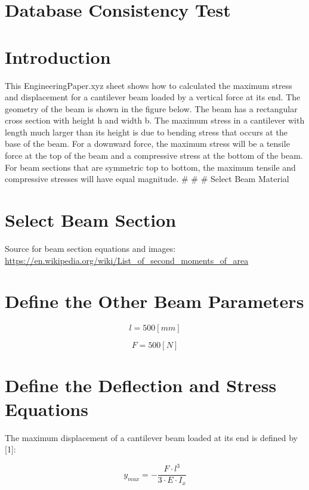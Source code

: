 \documentclass[
  letterpaper,
]{article}
\author{}
\date{}
\begin{document}
\section{Database Consistency Test}\label{database-consistency-test}

\section{Introduction}\label{introduction}

This EngineeringPaper.xyz sheet shows how to calculated the maximum
stress and displacement for a cantilever beam loaded by a vertical force
at its end. The geometry of the beam is shown in the figure below. The
beam has a rectangular cross section with height h and width b. The
maximum stress in a cantilever with length much larger than its height
is due to bending stress that occurs at the base of the beam. For a
downward force, the maximum stress will be a tensile force at the top of
the beam and a compressive stress at the bottom of the beam. For beam
sections that are symmetric top to bottom, the maximum tensile and
compressive stresses will have equal magnitude. \# \# \# Select Beam
Material

\section{Select Beam Section}\label{select-beam-section}

Source for beam section equations and images:
\url{https://en.wikipedia.org/wiki/List_of_second_moments_of_area}

\section{Define the Other Beam
Parameters}\label{define-the-other-beam-parameters}

\[ l=500\left[mm\right]   \]

\[ F=500\left[N\right]   \]

\section{Define the Deflection and Stress
Equations}\label{define-the-deflection-and-stress-equations}

The maximum displacement of a cantilever beam loaded at its end is
defined by {[}1{]}:

\[ y_{max}=-\frac{F\cdot l^{3}}{3\cdot E\cdot I_{x}}   \]
\end{document}
